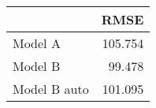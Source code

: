 
\begin{tabular}{l|r}
\hline
  & RMSE\\
\hline
Model A & 105.754\\
\hline
Model B & 99.478\\
\hline
Model B auto & 101.095\\
\hline
\end{tabular}